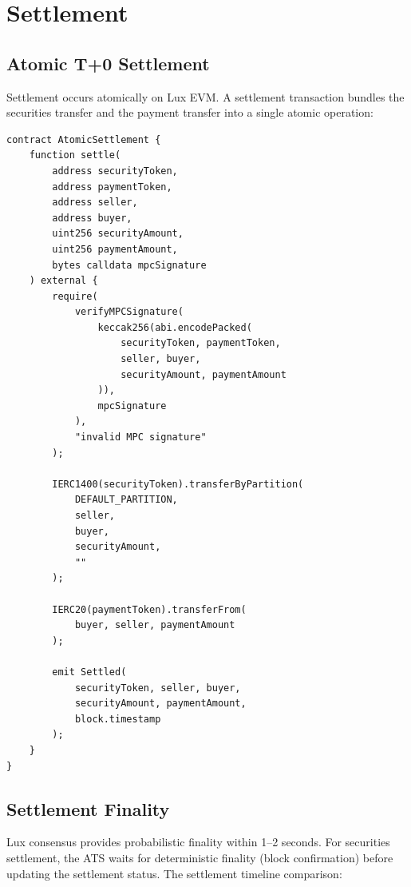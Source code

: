 \section{Settlement}
\label{sec:settlement}

\subsection{Atomic T+0 Settlement}

Settlement occurs atomically on Lux EVM. A settlement transaction bundles the securities transfer and the payment transfer into a single atomic operation:

\begin{lstlisting}[language=Solidity,caption={Atomic settlement contract.}]
contract AtomicSettlement {
    function settle(
        address securityToken,
        address paymentToken,
        address seller,
        address buyer,
        uint256 securityAmount,
        uint256 paymentAmount,
        bytes calldata mpcSignature
    ) external {
        require(
            verifyMPCSignature(
                keccak256(abi.encodePacked(
                    securityToken, paymentToken,
                    seller, buyer,
                    securityAmount, paymentAmount
                )),
                mpcSignature
            ),
            "invalid MPC signature"
        );

        IERC1400(securityToken).transferByPartition(
            DEFAULT_PARTITION,
            seller,
            buyer,
            securityAmount,
            ""
        );

        IERC20(paymentToken).transferFrom(
            buyer, seller, paymentAmount
        );

        emit Settled(
            securityToken, seller, buyer,
            securityAmount, paymentAmount,
            block.timestamp
        );
    }
}
\end{lstlisting}

\subsection{Settlement Finality}

Lux consensus provides probabilistic finality within 1--2 seconds. For securities settlement, the ATS waits for deterministic finality (block confirmation) before updating the settlement status. The settlement timeline comparison:

